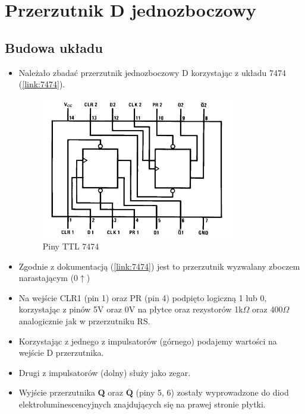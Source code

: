 \chapter{Przerzutnik D jednozboczowy}

\section{Budowa układu}

\begin{itemize}
    \item Należało zbadać przerzutnik jednozboczowy D korzystając z układu 7474 (\ref{link:7474}).
        \begin{figure}[H]
            \centering
            \includegraphics[width=0.8\textwidth]{img/schemes/7474_pins.png}
            \caption{Piny TTL 7474}
            \label{D_jednozboczowy:piny}
        \end{figure}
    \item Zgodnie z dokumentacją (\ref{link:7474}) jest to przerzutnik wyzwalany zboczem narastającym (0$\uparrow$)
    \item Na wejście CLR1 (pin 1) oraz PR (pin 4) podpięto logiczną 1 lub 0, korzystając z pinów 5V oraz 0V na płytce oraz rezystorów 1k$\Omega$ oraz 400$\Omega$ analogicznie jak w przerzutniku RS.
    \item Korzystając z jednego z impulsatorów (górnego) podajemy wartości na wejście D przerzutnika.
    \item Drugi z impulsatorów (dolny) służy jako zegar.
    \item Wyjście przerzutnika \textbf{Q} oraz $\overline{\textbf{Q}}$ (piny 5, 6) zostały wyprowadzone do diod elektroluminescencyjnych znajdujących się na prawej stronie płytki.
        \begin{figure}[H]

\end{figure}
\end{itemize}
